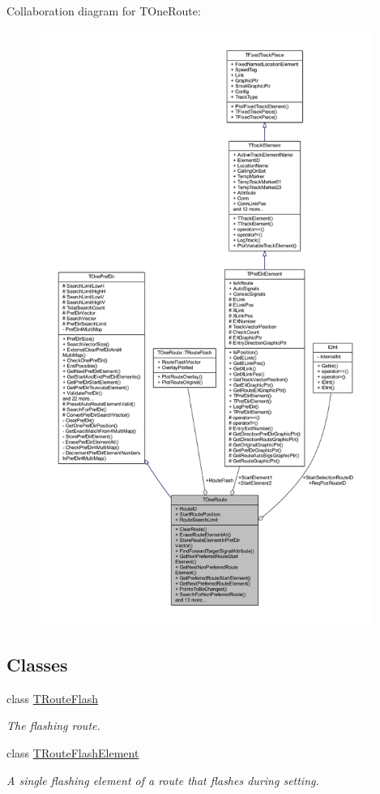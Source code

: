 Collaboration diagram for T\+One\+Route\+:
\nopagebreak
\begin{figure}[H]
\begin{center}
\leavevmode
\includegraphics[height=550pt]{class_t_one_route__coll__graph}
\end{center}
\end{figure}
\subsection*{Classes}
\begin{DoxyCompactItemize}
\item 
class \mbox{\hyperlink{class_t_one_route_1_1_t_route_flash}{T\+Route\+Flash}}
\begin{DoxyCompactList}\small\item\em The flashing route. \end{DoxyCompactList}\item 
class \mbox{\hyperlink{class_t_one_route_1_1_t_route_flash_element}{T\+Route\+Flash\+Element}}
\begin{DoxyCompactList}\small\item\em A single flashing element of a route that flashes during setting. \end{DoxyCompactList}\end{DoxyCompactItemize}
